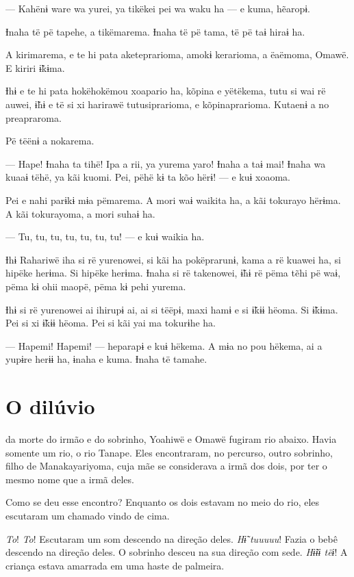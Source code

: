 --- Kahënɨ ware wa yurei, ya tikëkei pei wa waku ha --- e kuma, hẽaropɨ.

Ɨnaha të pë tapehe, a tikëmarema. Ɨnaha të pë tama, të pë taɨ hiraɨ ha. 

A kirimarema, e te hi pata aketeprarioma, amokɨ kerarioma, a ëaëmoma,
 Omawë. E kiriri ɨ̃kɨma. 

Ɨhɨ e te hi pata hokëhokëmou xoapario ha, kõpina e yëtëkema, tutu si wai
rë auwei, ɨ̃hɨ e të si xi harirawë tutusiprarioma, e kõpinaprarioma.
Kutaenɨ a no preapraroma. 

Pë tëënɨ a nokarema. 

--- Hape! Ɨnaha ta tihë! Ipa a rii, ya yurema yaro! Ɨnaha a taɨ mai! Ɨnaha
wa kuaaɨ tëhë, ya kãi kuomi. Pei, pëhë kɨ ta kõo hërɨ! --- e kuɨ
xoaoma. 

Pei e nahi parɨkɨ mɨa pëmarema. A mori waɨ waikita ha, a kãi tokurayo
hërɨma. A kãi tokurayoma, a mori suhaɨ ha. 

--- Tu, tu, tu, tu, tu, tu, tu! --- e kuɨ waikia ha. 

Ɨhɨ Rahariwë iha si rë yurenowei, si kãi ha pokëprarunɨ, kama a rë
 kuawei ha, si hipëke herɨma. Si hipëke herɨma. Ɨnaha si rë takenowei,
 ɨ̃hɨ rë pëma tẽhi pë waɨ, pëma kɨ ohii maopë, pëma kɨ pehi yurema. 

Ɨhɨ si rë yurenowei ai ihirupɨ ai, ai si tëëpɨ, maxi hamɨ e si ɨ̃kɨɨ
 hëoma. Si ɨ̃kɨma. Pei si xi ɨ̃kɨɨ hëoma. Pei si kãi yai ma tokurɨhe ha. 

--- Hapemi! Hapemi! --- heparapɨ e kuɨ hëkema. A mɨa no pou hëkema, ai a
 yupɨre herɨɨ ha, ɨnaha e kuma. Ɨnaha të tamahe. 

\chapter*{O dilúvio\smallskip{}}

 da morte do irmão e do sobrinho, Yoahiwë e Omawë fugiram rio
abaixo. Havia somente um rio, o rio Tanape. Eles encontraram, no
percurso, outro sobrinho, filho de Manakayariyoma, cuja mãe se
considerava a irmã dos dois, por ter o mesmo nome que a irmã deles. 

Como se deu esse encontro? Enquanto os dois estavam no meio do rio, eles
escutaram um chamado vindo de cima. 

\textit{To}! \textit{To}! Escutaram um som descendo na direção deles. \textit{Hɨ̃ tuuuuu}! Fazia o
bebê descendo na direção deles. O sobrinho desceu na sua direção com
sede. \textit{Hɨ̃ɨɨ tëɨ}! A criança estava amarrada em uma haste de palmeira.

